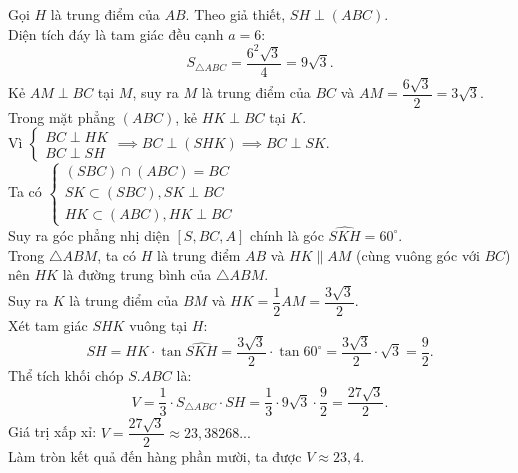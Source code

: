 \begin{ex}
{\begin{center}
		\end{center}
		Gọi $H$ là trung điểm của $AB$. Theo giả thiết, $SH \perp \left( ABC \right)$. \\
		Diện tích đáy là tam giác đều cạnh $a = 6$: 
		$$S_{\triangle ABC} = \dfrac{6^2\sqrt{3}}{4} = 9\sqrt{3}.$$
		Kẻ $AM \perp BC$ tại $M$, suy ra $M$ là trung điểm của $BC$ và $AM = \dfrac{6\sqrt{3}}{2} = 3\sqrt{3}$. \\
		Trong mặt phẳng $\left( ABC \right)$, kẻ $HK \perp BC$ tại $K$. \\
		Vì $\begin{cases} BC \perp HK \\ BC \perp SH \end{cases} \implies BC \perp \left( SHK \right) \implies BC \perp SK$. \\
		Ta có $\begin{cases} \left( SBC \right) \cap \left( ABC \right) = BC \\ SK \subset \left( SBC \right), SK \perp BC \\ HK \subset \left( ABC \right), HK \perp BC \end{cases}$ \\
		Suy ra góc phẳng nhị diện $\left[ S, BC, A \right]$ chính là góc $\widehat{SKH} = 60^\circ$. \\
		Trong $\triangle ABM$, ta có $H$ là trung điểm $AB$ và $HK \parallel AM$ (cùng vuông góc với $BC$) nên $HK$ là đường trung bình của $\triangle ABM$. \\
		Suy ra $K$ là trung điểm của $BM$ và $HK = \dfrac{1}{2}AM = \dfrac{3\sqrt{3}}{2}$. \\
		Xét tam giác $SHK$ vuông tại $H$:
		$$SH = HK \cdot \tan \widehat{SKH} = \dfrac{3\sqrt{3}}{2} \cdot \tan 60^\circ = \dfrac{3\sqrt{3}}{2} \cdot \sqrt{3} = \dfrac{9}{2}.$$
		Thể tích khối chóp $S.ABC$ là:
		$$V = \dfrac{1}{3} \cdot S_{\triangle ABC} \cdot SH = \dfrac{1}{3} \cdot 9\sqrt{3} \cdot \dfrac{9}{2} = \dfrac{27\sqrt{3}}{2}.$$
		Giá trị xấp xỉ: $V = \dfrac{27\sqrt{3}}{2} \approx 23,38268...$ \\
		Làm tròn kết quả đến hàng phần mười, ta được $V \approx 23,4$.
	}
\end{ex}


